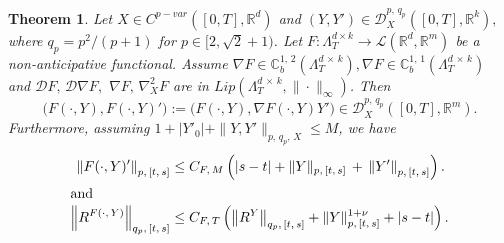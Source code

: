 \documentclass[10pt]{amsart}
\newtheorem{theo}{Theorem}[section]
\theoremstyle{definition}\newtheorem{defi}[theo]{Definition}\newtheorem{rema}[theo]{Remark}\newtheorem{exam}[theo]{Example}\newtheorem{exem}[theo]{Example}\newtheorem{nota}[theo]{Notation}
\newcommand{\scrD}{\mathscr{D}}
\newcommand{\bbC}{\mathbb{C}}
\newcommand{\calD}{\mathcal{D}}
\newcommand{\calL}{\mathcal{L}}
\newcommand{\Rr}{{\mathbb{R}}}
\begin{document}
\begin{theo}\label{chp3theorem:actiononpaths}
Let $X\in C^{p-var}([0,T],\Rr^d)$ and $(Y,Y')\in \scrD^{p,\,q_p}_{X}([0,T],\Rr^k),$ where $q_p=p^2/(p+1)$ for $p\in [2, \sqrt{2}+1)$.
Let $F\colon \Lambda^{d\times k}_T\to \calL(\Rr^d,\Rr^m)$ be a non-anticipative functional. Assume $\nabla F\in \bbC^{1,\,2}_b(\Lambda^{d\,\times\,k}_T), \nabla F\in \bbC^{1,\,1}_b(\Lambda^{d\,\times\,k}_T)$ and $\calD F,\, \calD\nabla F,$ $\nabla F,\, \nabla^2_{X} F$ are in $Lip(\Lambda^{d\,\times\,k}_T, \|\cdot\|_{\infty})$. Then
\[
\big(F(\cdot,Y), F(\cdot,Y)'\big):=\big(F(\cdot,Y),\nabla F(\cdot,Y)Y'\big)\in \scrD^{p,\,q_p}_{X}\left([0,T],\Rr^m\right).
\]
Furthermore, assuming $1+|Y'_0|+\|Y,Y'\|_{p,\,q_p,\,X}\leq M$, we have
\begin{align*}
\left\|F(\cdot, Y)'\right\|_{p,\,[t,\,s]}&\leq C_{F,\,M}\left(|s-t|+\|Y\|_{p,\,[t,\,s]}\, +\, \left\|Y'\right\|_{p,\,[t,\,s]}\right).
\\
\intertext{and}
\left\|R^{F(\cdot,\,Y)}\right\|_{q_p,\,[t,\,s]}
&\leq C_{F,\,T}\left(
\left\|R^Y\right\|_{q_p,\,[t,\,s]}+ \|Y\|_{p,\, [t,\,s]}^{1+\nu}+|s-t|\right).
\end{align*}
\end{theo}
\end{document}

